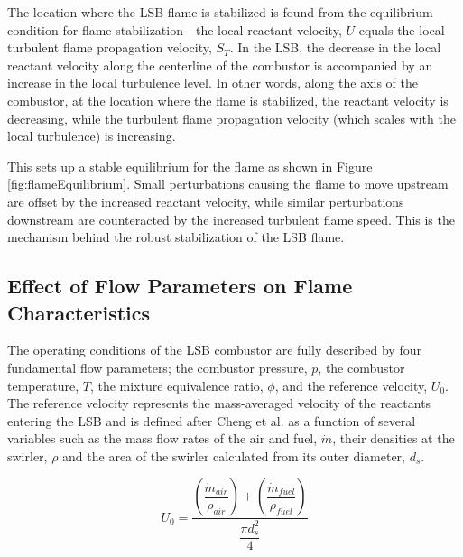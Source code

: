 The location where the LSB flame is stabilized is found from the equilibrium condition for flame stabilization---the local reactant velocity, \(U\) equals the local turbulent flame propagation velocity, \(S_T\).
In the LSB, the decrease in the local reactant velocity along the centerline of the combustor is accompanied by an increase in the local turbulence level.
In other words, along the axis of the combustor, at the location where the flame is stabilized, the reactant velocity is decreasing, while the turbulent flame propagation velocity (which scales with the local turbulence) is increasing.


This sets up a stable equilibrium for the flame as shown in Figure \ref{fig:flameEquilibrium}.
Small perturbations causing the flame to move upstream are offset by the increased reactant velocity, while similar perturbations downstream are counteracted by the increased turbulent flame speed.
This is the mechanism behind the robust stabilization of the LSB flame.



\subsection{Effect of Flow Parameters on Flame Characteristics}

The operating conditions of the LSB combustor are fully described by four fundamental flow parameters; the combustor pressure, \(p\), the combustor temperature, \(T\), the mixture equivalence ratio, \(\phi\), and the reference velocity, \(U_0\).
The reference velocity represents the mass-averaged velocity of the reactants entering the LSB and is defined after Cheng et al.\cite{2000-cheng} as a function of several variables such as the mass flow rates of the air and fuel, \(\dot{m}\), their densities at the swirler, \(\rho\) and the area of the swirler calculated from its outer diameter, \(d_s\).

\begin{equation}
U_0 = \frac{ \left( \dfrac{ \dot{m}_{air} }{ \rho_{air} } \right) + \left( \dfrac{ \dot{m}_{fuel} }{ \rho_{fuel} }\right) }{ \dfrac{\pi d_s^2 }{4} }
\label{eqn:referenceVelocity}
\end{equation}



